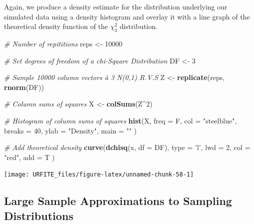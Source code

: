 \documentclass[]{book}
\newenvironment{Shaded}{\begin{snugshade}}{\end{snugshade}}
\newcommand{\KeywordTok}[1]{\textcolor[rgb]{0.13,0.29,0.53}{\textbf{#1}}}
\newcommand{\DataTypeTok}[1]{\textcolor[rgb]{0.13,0.29,0.53}{#1}}
\newcommand{\DecValTok}[1]{\textcolor[rgb]{0.00,0.00,0.81}{#1}}
\newcommand{\StringTok}[1]{\textcolor[rgb]{0.31,0.60,0.02}{#1}}
\newcommand{\CommentTok}[1]{\textcolor[rgb]{0.56,0.35,0.01}{\textit{#1}}}
\newcommand{\OperatorTok}[1]{\textcolor[rgb]{0.81,0.36,0.00}{\textbf{#1}}}
\newcommand{\NormalTok}[1]{#1}
\theoremstyle{definition}
\theoremstyle{definition}
\theoremstyle{definition}
\theoremstyle{remark}
\begin{document}
Again, we produce a density estimate for the distribution underlying our
simulated data using a density histogram and overlay it with a line
graph of the theoretical density function of the \(\chi^2_3\)
distribution.

\begin{Shaded}
\begin{Highlighting}[]
\CommentTok{# Number of repititions}
\NormalTok{reps <-}\StringTok{ }\DecValTok{10000}

\CommentTok{# Set degrees of freedom of a chi-Square Distribution}
\NormalTok{DF <-}\StringTok{ }\DecValTok{3} 

\CommentTok{# Sample 10000 column vectors à 3 N(0,1) R.V.S}
\NormalTok{Z <-}\StringTok{ }\KeywordTok{replicate}\NormalTok{(reps, }\KeywordTok{rnorm}\NormalTok{(DF)) }

\CommentTok{# Column sums of squares}
\NormalTok{X <-}\StringTok{ }\KeywordTok{colSums}\NormalTok{(Z}\OperatorTok{^}\DecValTok{2}\NormalTok{)}

\CommentTok{# Histogram of column sums of squares}
\KeywordTok{hist}\NormalTok{(X, }
     \DataTypeTok{freq =}\NormalTok{ F, }
     \DataTypeTok{col =} \StringTok{"steelblue"}\NormalTok{, }
     \DataTypeTok{breaks =} \DecValTok{40}\NormalTok{, }
     \DataTypeTok{ylab =} \StringTok{"Density"}\NormalTok{, }
     \DataTypeTok{main =} \StringTok{""}
\NormalTok{     )}

\CommentTok{# Add theoretical density}
\KeywordTok{curve}\NormalTok{(}\KeywordTok{dchisq}\NormalTok{(x, }\DataTypeTok{df =}\NormalTok{ DF), }
      \DataTypeTok{type =} \StringTok{'l'}\NormalTok{, }
      \DataTypeTok{lwd =} \DecValTok{2}\NormalTok{, }
      \DataTypeTok{col =} \StringTok{"red"}\NormalTok{, }
      \DataTypeTok{add =}\NormalTok{ T}
\NormalTok{      )}
\end{Highlighting}
\end{Shaded}

\begin{center}\texttt{[image: URFITE\_files/figure-latex/unnamed-chunk-58-1]} \end{center}

\subsection*{Large Sample Approximations to Sampling
Distributions}\label{large-sample-approximations-to-sampling-distributions}
\end{document}
